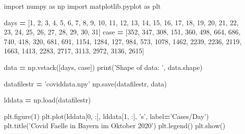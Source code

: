 \documentclass[]{book}
\newenvironment{Shaded}{\begin{snugshade}}{\end{snugshade}}
\newcommand{\BuiltInTok}[1]{#1}
\newcommand{\DecValTok}[1]{\textcolor[rgb]{0.00,0.00,0.81}{#1}}
\newcommand{\ImportTok}[1]{#1}
\newcommand{\NormalTok}[1]{#1}
\newcommand{\OperatorTok}[1]{\textcolor[rgb]{0.81,0.36,0.00}{\textbf{#1}}}
\newcommand{\StringTok}[1]{\textcolor[rgb]{0.31,0.60,0.02}{#1}}
\theoremstyle{definition}
\theoremstyle{definition}
\theoremstyle{definition}
\theoremstyle{definition}
\theoremstyle{remark}
\begin{document}
\begin{Shaded}
\begin{Highlighting}[]
\ImportTok{import}\NormalTok{ numpy }\ImportTok{as}\NormalTok{ np}
\ImportTok{import}\NormalTok{ matplotlib.pyplot }\ImportTok{as}\NormalTok{ plt}

\NormalTok{days }\OperatorTok{=}\NormalTok{ [}\DecValTok{1}\NormalTok{, }\DecValTok{2}\NormalTok{, }\DecValTok{3}\NormalTok{, }\DecValTok{4}\NormalTok{, }\DecValTok{5}\NormalTok{, }\DecValTok{6}\NormalTok{, }\DecValTok{7}\NormalTok{, }\DecValTok{8}\NormalTok{, }\DecValTok{9}\NormalTok{, }\DecValTok{10}\NormalTok{, }\DecValTok{11}\NormalTok{,}
        \DecValTok{12}\NormalTok{, }\DecValTok{13}\NormalTok{, }\DecValTok{14}\NormalTok{, }\DecValTok{15}\NormalTok{,  }\DecValTok{16}\NormalTok{, }\DecValTok{17}\NormalTok{, }\DecValTok{18}\NormalTok{, }\DecValTok{19}\NormalTok{,  }\DecValTok{20}\NormalTok{,   }\DecValTok{21}\NormalTok{,}
        \DecValTok{22}\NormalTok{,  }\DecValTok{23}\NormalTok{,  }\DecValTok{24}\NormalTok{,   }\DecValTok{25}\NormalTok{,    }\DecValTok{26}\NormalTok{, }\DecValTok{27}\NormalTok{,  }\DecValTok{28}\NormalTok{,   }\DecValTok{29}\NormalTok{,    }\DecValTok{30}\NormalTok{,     }\DecValTok{31}\NormalTok{]}
\NormalTok{case }\OperatorTok{=}\NormalTok{ [}\DecValTok{352}\NormalTok{, }\DecValTok{347}\NormalTok{, }\DecValTok{308}\NormalTok{, }\DecValTok{151}\NormalTok{, }\DecValTok{360}\NormalTok{, }\DecValTok{498}\NormalTok{, }\DecValTok{664}\NormalTok{, }\DecValTok{686}\NormalTok{, }\DecValTok{740}\NormalTok{, }\DecValTok{418}\NormalTok{, }\DecValTok{320}\NormalTok{,}
        \DecValTok{681}\NormalTok{, }\DecValTok{691}\NormalTok{, }\DecValTok{1154}\NormalTok{, }\DecValTok{1284}\NormalTok{,  }\DecValTok{127}\NormalTok{, }\DecValTok{984}\NormalTok{, }\DecValTok{573}\NormalTok{, }\DecValTok{1078}\NormalTok{,  }\DecValTok{1462}\NormalTok{,   }\DecValTok{2239}\NormalTok{,}
        \DecValTok{2236}\NormalTok{,  }\DecValTok{2119}\NormalTok{,  }\DecValTok{1663}\NormalTok{,   }\DecValTok{1413}\NormalTok{,    }\DecValTok{2283}\NormalTok{,}
        \DecValTok{2717}\NormalTok{,  }\DecValTok{3113}\NormalTok{,   }\DecValTok{2972}\NormalTok{,    }\DecValTok{3136}\NormalTok{,    }\DecValTok{2615}\NormalTok{]}

\NormalTok{data }\OperatorTok{=}\NormalTok{ np.vstack([days, case])}
\BuiltInTok{print}\NormalTok{(}\StringTok{'Shape of data: '}\NormalTok{, data.shape)}

\NormalTok{datafilestr }\OperatorTok{=} \StringTok{'coviddata.npy'}
\NormalTok{np.save(datafilestr, data)}

\NormalTok{lddata }\OperatorTok{=}\NormalTok{ np.load(datafilestr)}

\NormalTok{plt.figure(}\DecValTok{1}\NormalTok{)}
\NormalTok{plt.plot(lddata[}\DecValTok{0}\NormalTok{, :], lddata[}\DecValTok{1}\NormalTok{, :], }\StringTok{'s'}\NormalTok{, label}\OperatorTok{=}\StringTok{'Cases/Day'}\NormalTok{)}
\NormalTok{plt.title(}\StringTok{'Covid Faelle in Bayern im Oktober 2020'}\NormalTok{)}
\NormalTok{plt.legend()}
\NormalTok{plt.show()}
\end{Highlighting}
\end{Shaded}
\end{document}
